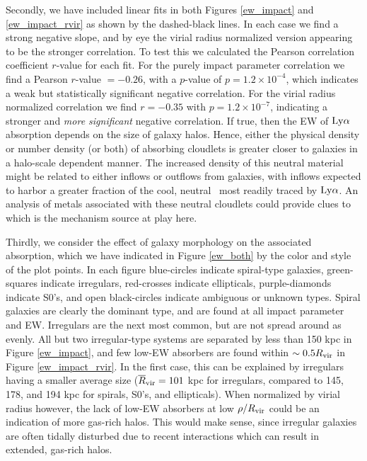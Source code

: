 Secondly, we have included linear fits in both Figures \ref{ew_impact} and \ref{ew_impact_rvir} as shown by the dashed-black lines. In each case we find a strong negative slope, and by eye the virial radius normalized version appearing to be the stronger correlation. To test this we calculated the Pearson correlation coefficient $r$-value for each fit. For the purely impact parameter correlation we find a Pearson $r$-value $=-0.26$, with a $p$-value of $p = 1.2 \times 10^{-4}$, which indicates a weak but statistically significant negative correlation. For the virial radius normalized correlation we find $r = -0.35$ with $p = 1.2 \times 10^{-7}$, indicating a stronger and \emph{more significant} negative correlation. If true, then the EW of $\rm Ly\alpha$ absorption depends on the size of galaxy halos. Hence, either the physical density or number density (or both) of absorbing cloudlets is greater closer to galaxies in a halo-scale dependent manner. The increased density of this neutral material might be related to either inflows or outflows from galaxies, with inflows expected to harbor a greater fraction of the cool, neutral \HI~most readily traced by $\rm Ly\alpha$. An analysis of metals associated with these neutral cloudlets could provide clues to which is the mechanism source at play here.

Thirdly, we consider the effect of galaxy morphology on the associated absorption, which we have indicated in Figure \ref{ew_both} by the color and style of the plot points. In each figure blue-circles indicate spiral-type galaxies, green-squares indicate irregulars, red-crosses indicate ellipticals, purple-diamonds indicate S0's, and open black-circles indicate ambiguous or unknown types. Spiral galaxies are clearly the dominant type, and are found at all impact parameter and EW. Irregulars are the next most common, but are not spread around as evenly. All but two irregular-type systems are separated by less than 150 kpc in Figure \ref{ew_impact}, and few low-EW absorbers are found within $\sim 0.5 R_{\rm vir}$ in Figure \ref{ew_impact_rvir}. In the first case, this can be explained by irregulars having a smaller average size ($\overline{R}_{\rm vir} = 101$ kpc for irregulars, compared to 145, 178, and 194 kpc for spirals, S0's, and ellipticals). When normalized by virial radius however, the lack of low-EW absorbers at low $\rho / R_{\rm vir}$ could be an indication of more gas-rich halos. This would make sense, since irregular galaxies are often tidally disturbed due to recent interactions which can result in extended, gas-rich halos.

